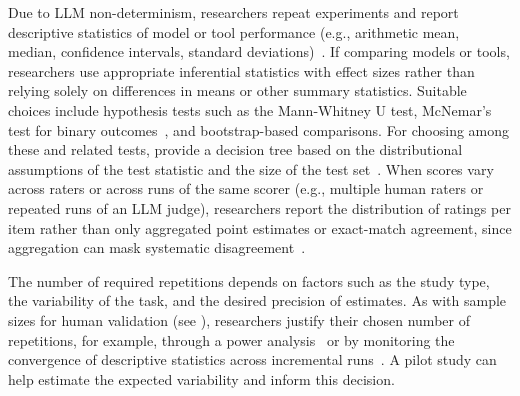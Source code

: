 Due to LLM non-determinism, researchers \should repeat experiments and report descriptive statistics of model or tool performance (e.g., arithmetic mean, median, confidence intervals, standard deviations)~\cite{DBLP:conf/nips/AgarwalSCCB21, DBLP:journals/corr/abs-2602-07150}. If comparing models or tools, researchers \should use appropriate inferential statistics with effect sizes rather than relying solely on differences in means or other summary statistics. Suitable choices include hypothesis tests such as the Mann-Whitney U test, McNemar's test for binary outcomes~\cite{DBLP:conf/iclr/KublerBKZYKK26}, and bootstrap-based comparisons. For choosing among these and related tests, \citeauthor{DBLP:conf/acl/DrorBSR18} provide a decision tree based on the distributional assumptions of the test statistic and the size of the test set~\cite{DBLP:conf/acl/DrorBSR18}. When scores vary across raters or across runs of the same scorer (e.g., multiple human raters or repeated runs of an LLM judge), researchers \should report the distribution of ratings per item rather than only aggregated point estimates or exact-match agreement, since aggregation can mask systematic disagreement~\cite{bean2025measuring}.

The number of required repetitions depends on factors such as the study type, the variability of the task, and the desired precision of estimates. As with sample sizes for human validation (see \humanvalidation), researchers \should justify their chosen number of repetitions, for example, through a power analysis~\cite{Cohen1992, DBLP:journals/corr/abs-2602-07150} or by monitoring the convergence of descriptive statistics across incremental runs~\cite{DBLP:journals/corr/abs-2410-03492}. A pilot study can help estimate the expected variability and inform this decision.

